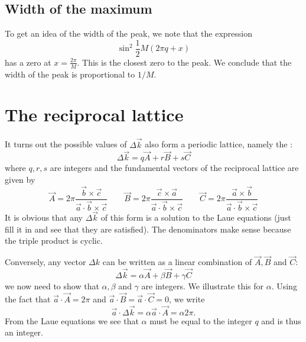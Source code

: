 \subsection{Width of the maximum}
To get an idea of the width of the peak, we note that the expression
\[ \sin^2 \frac{1}{2}M(2\pi q + x) \]
has a zero at $x = \frac{2\pi}{M}$. This is the closest zero to the peak. We conclude that the width of the peak is proportional to $1/M$.

\section{The reciprocal lattice}
It turns out the possible values of $\Delta \vec{k}$ also form a periodic lattice, namely the :
\[ \Delta \vec{k} = q \vec{A} + r \vec{B} + s \vec{C} \]
where $q,r,s$ are integers and the fundamental vectors of the reciprocal lattice are given by
\[ \boxed{\vec{A} = 2\pi \frac{\vec{b}\times \vec{c}}{\vec{a}\cdot \vec{b}\times \vec{c}} \qquad
\vec{B} = 2\pi \frac{\vec{c}\times \vec{a}}{\vec{a}\cdot \vec{b}\times \vec{c}} \qquad
\vec{C} = 2\pi \frac{\vec{a}\times \vec{b}}{\vec{a}\cdot \vec{b}\times \vec{c}}} \]
It is obvious that any $\Delta \vec{k}$ of this form is a solution to the Laue equations (just fill it in and see that they are satisfied). The denominators make sense because the triple product is cyclic.

Conversely, any vector $\Delta k$ can be written as a linear combination of $\vec{A}, \vec{B}$ and $\vec{C}$:
\[ \Delta \vec{k} = \alpha \vec{A} + \beta \vec{B} + \gamma \vec{C} \]
we now need to show that $\alpha, \beta$ and $\gamma$ are integers. We illustrate this for $\alpha$. Using the fact that $\vec{a}\cdot \vec{A} = 2\pi$ and $\vec{a}\cdot \vec{ B}= \vec{a}\cdot \vec{C} = 0$, we write
\[ \vec{a} \cdot \Delta \vec{k} = \alpha \vec{a}\cdot \vec{A} = \alpha 2\pi. \]
From the Laue equations we see that $\alpha$ must be equal to the integer $q$ and is thus an integer.
